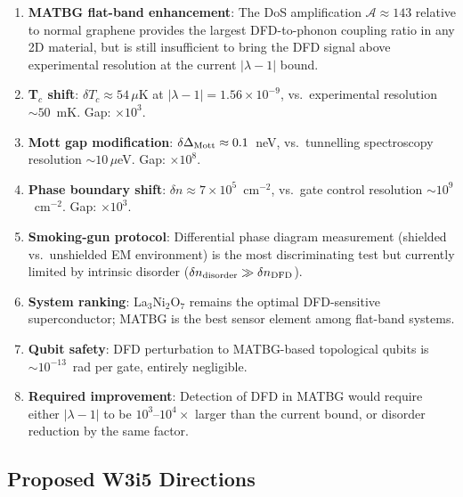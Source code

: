 \documentclass[11pt]{article}
\newcommand{\ee}[1]{\times 10^{#1}}
\newcommand{\Vmott}{\Delta_{\rm Mott}}
\newcommand{\lambdabound}{1.56\ee{-9}}
\begin{document}
\begin{enumerate}
  \item \textbf{MATBG flat-band enhancement}: The DoS amplification
    $\mathcal{A} \approx 143$ relative to normal graphene provides the
    largest DFD-to-phonon coupling ratio in any 2D material, but is
    still insufficient to bring the DFD signal above experimental resolution
    at the current $|\lambda-1|$ bound.

  \item \textbf{T$_c$ shift}: $\delta T_c \approx 54\,\mu$K at $|\lambda-1|
    = \lambdabound$, vs.\ experimental resolution $\sim 50$~mK.
    Gap: $\times 10^3$.

  \item \textbf{Mott gap modification}: $\delta\Vmott \approx 0.1$~neV,
    vs.\ tunnelling spectroscopy resolution $\sim 10\,\mu$eV.
    Gap: $\times 10^8$.

  \item \textbf{Phase boundary shift}: $\delta n \approx 7\ee{5}$~cm$^{-2}$,
    vs.\ gate control resolution $\sim 10^9$~cm$^{-2}$.
    Gap: $\times 10^3$.

  \item \textbf{Smoking-gun protocol}: Differential phase diagram measurement
    (shielded vs.\ unshielded EM environment) is the most discriminating
    test but currently limited by intrinsic disorder
    ($\delta n_{\rm disorder} \gg \delta n_{\rm DFD}$).

  \item \textbf{System ranking}: La$_3$Ni$_2$O$_7$ remains the optimal
    DFD-sensitive superconductor; MATBG is the best sensor element among
    flat-band systems.

  \item \textbf{Qubit safety}: DFD perturbation to MATBG-based topological
    qubits is $\sim 10^{-13}$~rad per gate, entirely negligible.

  \item \textbf{Required improvement}: Detection of DFD in MATBG would
    require either $|\lambda-1|$ to be $10^3$--$10^4\times$ larger than
    the current bound, or disorder reduction by the same factor.
\end{enumerate}

\subsection{Proposed W3i5 Directions}
\end{document}
